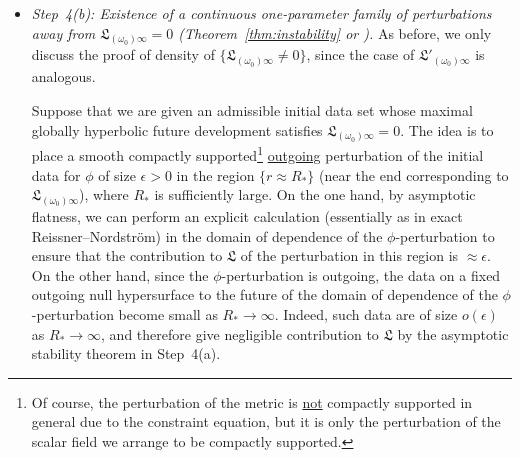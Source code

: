\documentclass[10pt, reqno]{amsart}
\theoremstyle{definition}
\theoremstyle{remark}
\numberwithin{equation}{section}
\newcommand{\set}[1]{\{#1\}}
\newcommand{\0}{\emptyset}
\newcommand{\eps}{\epsilon}
\newcommand{\omg}{\omega}
\newcommand{\pfstep}[1]{\vspace{.5em} {\it \noindent #1.}}
\begin{document}
\begin{itemize}
In order to achieve this goal, we establish asymptotic stability of the maximal globally hyperbolic development of any admissible initial data set in the exterior region for initial data perturbations that are small in a suitably weighted $C^{1}$ topology (see Theorem~\ref{thm:L-stability} for the precise definition of the topology). This is, in a sense, the most technically involved part of the entire series. The ingredients of its proof include the Price's law decay theorem in Step~2(a) (to obtain quantitative information about the background solution), choice of suitable future-normalized double null coordinate systems (since decay is expected only in a well-chosen coordinate system), an interaction Morawetz estimate (to control the nonlinearity), $r^{p}$-weighted energy method of Dafermos--Rodnianski \cite{DRNM}, integration along characteristics method from \cite{LO1} (both for proving decay of the nonlinear perturbation) etc. We refer the reader to \cite[Section~8.1]{LO.exterior} for further discussions.

\item \pfstep{Step~4(b): Existence of a continuous one-parameter family of perturbations away from $\mathfrak{L}_{(\omg_{0}) \infty} = 0$ (Theorem~\ref{thm:instability} or \cite[Theorem~4.3]{LO.exterior})}
As before, we only discuss the proof of density of $\set{\mathfrak{L}_{(\omg_{0}) \infty} \neq 0}$, since the case of $\mathfrak{L}'_{(\omg_{0}) \infty}$ is analogous.

Suppose that we are given an admissible initial data set whose maximal globally hyperbolic future development satisfies $\mathfrak{L}_{(\omg_{0}) \infty} = 0$. The idea is to place a smooth compactly supported\footnote{Of course, the perturbation of the metric is \underline{not} compactly supported in general due to the constraint equation, but it is only the perturbation of the scalar field we arrange to be compactly supported.} \underline{outgoing} perturbation of the initial data for $\phi$ of size $\eps > 0$ in the region $\set{r \approx R_{\ast}}$ (near the end corresponding to $\mathfrak{L}_{(\omg_{0}) \infty}$), where $R_{\ast}$ is sufficiently large. On the one hand, by asymptotic flatness, we can perform an explicit calculation (essentially as in exact Reissner--Nordstr\"om) in the domain of dependence of the $\phi$-perturbation to ensure that the contribution to $\mathfrak{L}$ of the perturbation in this region is $\approx \eps$. 
On the other hand, since the $\phi$-perturbation is outgoing, the data on a fixed outgoing null hypersurface to the future of the domain of dependence of the $\phi$-perturbation become small as $R_{\ast} \to \infty$. Indeed, such data are of size $o(\eps)$ as $R_{\ast} \to \infty$, and therefore give negligible contribution to $\mathfrak L$ by the asymptotic stability theorem in Step~4(a).


\end{itemize}
\end{document}
